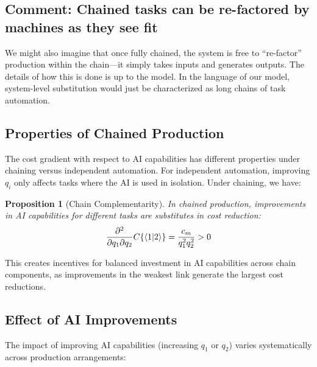 \documentclass{article}
\newtheorem{proposition}[theorem]{Proposition}
\begin{document}
\begin{tcolorbox}
\subsection{Comment: Chained tasks can be re-factored by machines as they see fit}
We might also imagine that once fully chained, the system is free to ``re-factor'' production within the chain---it simply takes inputs and generates outputs.
The details of how this is done is up to the model. 
In the language of our model, system-level substitution would just be characterized as long chains of task automation.
\end{tcolorbox}

\subsection{Properties of Chained Production}
The cost gradient with respect to AI capabilities has different properties under chaining versus independent automation.
For independent automation, improving $q_i$ only affects tasks where the AI is used in isolation.
Under chaining, we have:

\begin{proposition}[Chain Complementarity]
In chained production, improvements in AI capabilities for different tasks are substitutes in cost reduction:
\begin{equation}
    \frac{\partial^2}{\partial q_1 \partial q_2} C\{ \langle 1|2 \rangle \} = \frac{c_m}{q_1^2q_2^2} > 0
\end{equation}
\end{proposition}

This creates incentives for balanced investment in AI capabilities across chain components, as improvements in the weakest link generate the largest cost reductions.

\subsection{Effect of AI Improvements}
The impact of improving AI capabilities (increasing $q_1$ or $q_2$) varies systematically across production arrangements:
\end{document}
